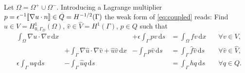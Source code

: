 \documentclass[r]{siamart171218}
\begin{document}
Let $\Omega=\Omega^{+}\cup\Omega^{-}$. Introducing a Lagrange multiplier
$p=\epsilon^{-1}[\![\nabla u \cdot n]\!]\in Q=H^{-1/2}(\Gamma)$
the weak form of \eqref{eq:coupled} reads: Find $u\in V=H^1_{0, \Gamma_D}(\Omega)$,
$\hat{v}\in\hat{V}=H^1(\Gamma)$, $p\in Q$ such that
%
\begin{equation}\label{eq:coupled_weak}
  \begin{aligned}
    &\int_{\Omega}\nabla u\cdot \nabla v\,\mathrm{d}x &\phantom{+\int_{\Gamma}\nabla \hat{u}\cdot \nabla \hat{v}} &+\epsilon\int_{\Gamma} p v\,\mathrm{d}s &= \int_{\Omega}f v\,\mathrm{d}x \quad &\forall v\in V,\\
    &\phantom{\int_{\Omega}\nabla u\cdot \nabla v} &+{\int_{\Gamma}\nabla \hat{u}\cdot \nabla \hat{v} + \hat{u}\hat{v}\,\mathrm{d}x} &-\int_{\Gamma} p\hat{v}\,\mathrm{d}s &= \int_{\Gamma}\hat{f}\hat{v}\,\mathrm{d}s \quad &\forall \hat{v}\in \hat{V},\\
    &\epsilon\int_{\Gamma}u q\,\mathrm{d}s &-\int_{\Gamma}\hat{u}q\,\mathrm{d}s &\phantom{-\int{\Gamma}q\hat{v}} &= \int_{\Gamma}h q\,\mathrm{d}s \quad &\forall q\in Q.
  \end{aligned}
\end{equation}
\end{document}
